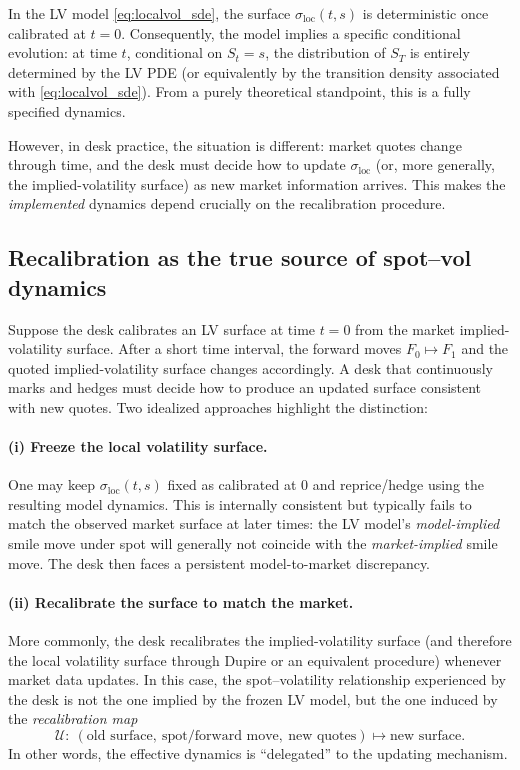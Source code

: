 \documentclass[11pt,a4paper]{report}
\begin{document}
In the LV model \eqref{eq:localvol_sde}, the surface $\sigma_{\mathrm{loc}}(t,s)$ is deterministic once calibrated at $t=0$.
Consequently, the model implies a specific conditional evolution:
at time $t$, conditional on $S_t=s$, the distribution of $S_T$ is entirely determined by the LV PDE (or equivalently by the transition density associated with \eqref{eq:localvol_sde}).
From a purely theoretical standpoint, this is a fully specified dynamics.

However, in desk practice, the situation is different: market quotes change through time, and the desk must decide how to update $\sigma_{\mathrm{loc}}$ (or, more generally, the implied-volatility surface) as new market information arrives.
This makes the \emph{implemented} dynamics depend crucially on the recalibration procedure.

\subsection{Recalibration as the true source of spot--vol dynamics}
Suppose the desk calibrates an LV surface at time $t=0$ from the market implied-volatility surface.
After a short time interval, the forward moves $F_0\mapsto F_1$ and the quoted implied-volatility surface changes accordingly.
A desk that continuously marks and hedges must decide how to produce an updated surface consistent with new quotes.
Two idealized approaches highlight the distinction:

\paragraph{(i) Freeze the local volatility surface.}
One may keep $\sigma_{\mathrm{loc}}(t,s)$ fixed as calibrated at $0$ and reprice/hedge using the resulting model dynamics.
This is internally consistent but typically fails to match the observed market surface at later times:
the LV model's \emph{model-implied} smile move under spot will generally not coincide with the \emph{market-implied} smile move.
The desk then faces a persistent model-to-market discrepancy.

\paragraph{(ii) Recalibrate the surface to match the market.}
More commonly, the desk recalibrates the implied-volatility surface (and therefore the local volatility surface through Dupire or an equivalent procedure) whenever market data updates.
In this case, the spot--volatility relationship experienced by the desk is not the one implied by the frozen LV model, but the one induced by the \emph{recalibration map}
\begin{equation}
\mathcal{U}:\ (\text{old surface},\ \text{spot/forward move},\ \text{new quotes}) \longmapsto \text{new surface}.
\end{equation}
In other words, the effective dynamics is ``delegated'' to the updating mechanism.
\end{document}
